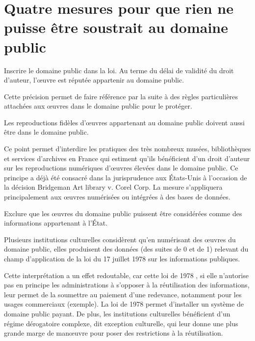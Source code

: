 \section{Quatre mesures pour que rien ne puisse être soustrait au domaine public}
\begin{mesure}
Inscrire le domaine public dans la loi. Au terme du délai de validité du droit d'auteur, l'œuvre est réputée appartenir au domaine public.
\end{mesure}

Cette précision permet de faire référence par la suite à des règles particulières attachées aux œuvres dans le domaine public pour le protéger.

\begin{mesure}
Les reproductions fidèles d’œuvres appartenant au domaine public doivent aussi être dans le domaine public.
\end{mesure}

Ce point permet d'interdire les pratiques des très nombreux musées, bibliothèques et services d’archives en France qui estiment qu’ils bénéficient d’un droit d’auteur sur les reproductions numériques d’œuvres élevées dans le domaine public. Ce principe a déjà été consacré dans la jurisprudence aux États-Unis à l’occasion de la décision Bridgeman Art library v. Corel Corp. La mesure s'appliquera principalement aux œuvres numérisées ou intégrées à des bases de données.

\begin{mesure}
Exclure que les œuvres du domaine public puissent être considérées comme des informations appartenant à l'État.
\end{mesure}

Plusieurs institutions culturelles considèrent qu’en numérisant des œuvres du domaine public, elles produisent des données (des suites de 0 et de 1) relevant du champ d’application de la loi du 17 juillet 1978 sur les informations publiques.

Cette interprétation a un effet redoutable, car cette loi de 1978 , si elle n’autorise pas en principe les administrations à s’opposer à la réutilisation des informations, leur permet de la soumettre au paiement d’une redevance, notamment pour les usages commerciaux (exemple). La loi de 1978 permet d'installer un système de domaine public payant. De plus, les institutions culturelles bénéficient d’un régime dérogatoire complexe, dit exception culturelle, qui leur donne une plus grande marge de manœuvre pour poser des restrictions à la réutilisation.

